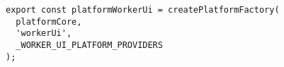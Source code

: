 \begin{verbatim}
export const platformWorkerUi = createPlatformFactory(
  platformCore,
  'workerUi',
  _WORKER_UI_PLATFORM_PROVIDERS
);
\end{verbatim}
